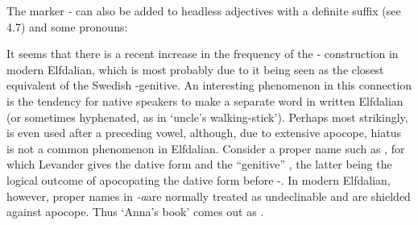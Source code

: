 
The marker\textit{ {}-} can also be added to headless adjectives with a definite suffix (see 4.7) and some pronouns:


\ea\label{}



\z 
\z


It seems that there is a recent increase in the frequency of the \nobreakdash- construction in modern Elfdalian, which is most probably due to it being seen as the closest equivalent of the Swedish -genitive. An interesting phenomenon in this connection is the tendency for native speakers to make  a separate word in written Elfdalian (or sometimes hyphenated, as in  ‘uncle’s walking-stick’). Perhaps most strikingly,  is even used after a preceding vowel, although, due to extensive apocope, hiatus is not a common phenomenon in Elfdalian. Consider a proper name such as , for which Levander gives the dative form  and the “genitive” , the latter being the logical outcome of apocopating the dative form before {}-. In modern Elfdalian, however, proper names in\textit{ {}-a}\textstyleLinguisticExample{ }are normally treated as undeclinable and are shielded against apocope. Thus ‘Anna’s book’ comes out as . 

